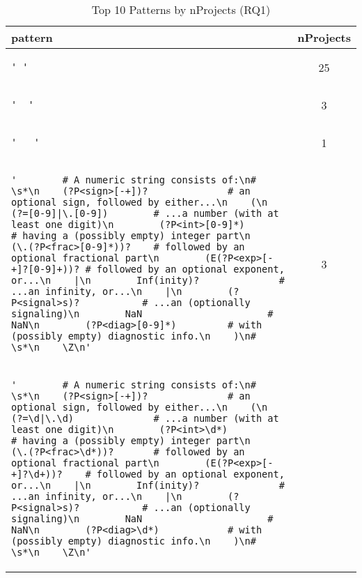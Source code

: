 \begin{table}
\begin{center}
\caption{Top 10 Patterns by nProjects (RQ1)}
\label{table:topNW}
\begin{tabular}{lc}
\toprule
pattern & nProjects \\ 
\midrule
\begin{minipage}{2.4in}
\begin{verbatim}
' '\end{verbatim}
\end{minipage}
& 25 \\ 
\midrule
\begin{minipage}{2.4in}
\begin{verbatim}
'  '\end{verbatim}
\end{minipage}
& 3 \\ 
\midrule
\begin{minipage}{2.4in}
\begin{verbatim}
'   '\end{verbatim}
\end{minipage}
& 1 \\ 
\midrule
\begin{minipage}{2.4in}
\begin{verbatim}
'        # A numeric string consists of:\n#    \s*\n    (?P<sign>[-+])?              # an optional sign, followed by either...\n    (\n        (?=[0-9]|\.[0-9])        # ...a number (with at least one digit)\n        (?P<int>[0-9]*)          # having a (possibly empty) integer part\n        (\.(?P<frac>[0-9]*))?    # followed by an optional fractional part\n        (E(?P<exp>[-+]?[0-9]+))? # followed by an optional exponent, or...\n    |\n        Inf(inity)?              # ...an infinity, or...\n    |\n        (?P<signal>s)?           # ...an (optionally signaling)\n        NaN                      # NaN\n        (?P<diag>[0-9]*)         # with (possibly empty) diagnostic info.\n    )\n#    \s*\n    \Z\n'\end{verbatim}
\end{minipage}
& 3 \\ 
\midrule
\begin{minipage}{2.4in}
\begin{verbatim}
'        # A numeric string consists of:\n#    \s*\n    (?P<sign>[-+])?              # an optional sign, followed by either...\n    (\n        (?=\d|\.\d)              # ...a number (with at least one digit)\n        (?P<int>\d*)             # having a (possibly empty) integer part\n        (\.(?P<frac>\d*))?       # followed by an optional fractional part\n        (E(?P<exp>[-+]?\d+))?    # followed by an optional exponent, or...\n    |\n        Inf(inity)?              # ...an infinity, or...\n    |\n        (?P<signal>s)?           # ...an (optionally signaling)\n        NaN                      # NaN\n        (?P<diag>\d*)            # with (possibly empty) diagnostic info.\n    )\n#    \s*\n    \Z\n'\end{verbatim}

\end{minipage}
\end{tabular}
\end{center}
\end{table}
